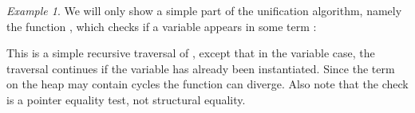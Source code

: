 \documentclass[copyright,creativecommons,sharealike]{eptcs}
\theoremstyle{remark}
\newtheorem{example}{Example}
\begin{document}
\begin{isabellebody}
\begin{isamarkuptext}
\begin{example}
  We will only show a simple
  part of the unification algorithm, namely the function , which
  checks if a variable  appears in some term :
\begin{quote}\parskip=0pt
\end{quote}
This is a simple recursive traversal of ,
  except that in the variable case, the traversal continues if the
  variable has already been instantiated.
  Since the term on the heap may contain cycles the function can
  diverge. Also note that the check  is a
  pointer equality test, not structural equality.


\end{example}
\end{isamarkuptext}
\end{isabellebody}
\end{document}
